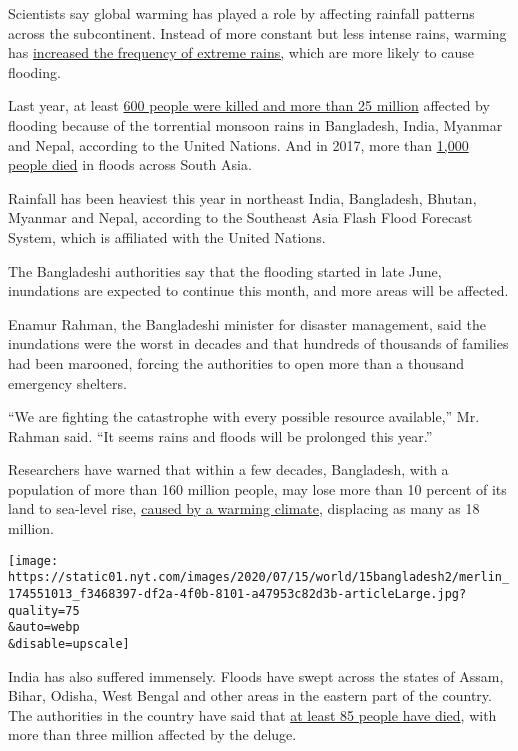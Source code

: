 Scientists say global warming has played a role by affecting rainfall
patterns across the subcontinent. Instead of more constant but less
intense rains, warming has
\href{https://slack-redir.net/link?url=https\%3A\%2F\%2Fwww.nature.com\%2Farticles\%2Fs41467-017-00744-9}{increased
the frequency of extreme rains,} which are more likely to cause
flooding.

Last year, at least
\href{https://www.indiatoday.in/india/story/600-people-killed-over-25-million-affected-flooding-india-bangladesh-nepal-myanmar-un-1574258-2019-07-27}{600
people were killed and more than 25 million} affected by flooding
because of the torrential monsoon rains in Bangladesh, India, Myanmar
and Nepal, according to the United Nations. And in 2017, more than
\href{https://www.nytimes.com/2017/08/29/world/asia/floods-south-asia-india-bangladesh-nepal-houston.html}{1,000
people died} in floods across South Asia.

Rainfall has been heaviest this year in northeast India, Bangladesh,
Bhutan, Myanmar and Nepal, according to the Southeast Asia Flash Flood
Forecast System, which is affiliated with the United Nations.

The Bangladeshi authorities say that the flooding started in late June,
inundations are expected to continue this month, and more areas will be
affected.

Enamur Rahman, the Bangladeshi minister for disaster management, said
the inundations were the worst in decades and that hundreds of thousands
of families had been marooned, forcing the authorities to open more than
a thousand emergency shelters.

``We are fighting the catastrophe with every possible resource
available,'' Mr. Rahman said. ``It seems rains and floods will be
prolonged this year.''

Researchers have warned that within a few decades, Bangladesh, with a
population of more than 160 million people, may lose more than 10
percent of its land to sea-level rise,
\href{https://www.nytimes.com/interactive/2019/04/11/magazine/climate-change-bangladesh-scavenging.html}{caused
by a warming climate}, displacing as many as 18 million.

\texttt{[image: https://static01.nyt.com/images/2020/07/15/world/15bangladesh2/merlin\_174551013\_f3468397-df2a-4f0b-8101-a47953c82d3b-articleLarge.jpg?quality=75\\\&auto=webp\\\&disable=upscale]}

India has also suffered immensely. Floods have swept across the states
of Assam, Bihar, Odisha, West Bengal and other areas in the eastern part
of the country. The authorities in the country have said that
\href{https://www.ndtv.com/india-news/assam-flood-6-more-dead-in-assam-as-flood-worsens-22-lakh-people-affected-2262196}{at
least 85 people have died}, with more than three million affected by the
deluge.

